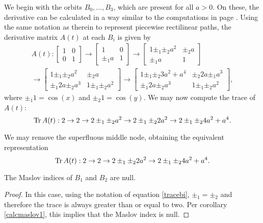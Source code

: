 We begin with the orbits $B_0, \dots, B_3$, which are present for all $a > 0$. On these, the derivative can be calculated in a way similar to the computations in page \pageref{rectpath1}. Using the same notation as therein to represent piecewise rectilinear paths, the derivative matrix $A(t)$ at each $B_i$ is given by
\begin{equation}
\begin{multlined}
A(t):
\begin{bmatrix}
1 & 0\\
0 & 1
\end{bmatrix}
\to
\begin{bmatrix}
1 & 0\\
\pm_1 a & 1
\end{bmatrix}
\to
\begin{bmatrix}
1 \pm_1 \pm_2 a^2 &  \pm_2 a\\
\pm_1 a & 1
\end{bmatrix}\\
\to
\begin{bmatrix}
1 \pm_1 \pm_2 a^2 &  \pm_2 a\\
\pm_1 2a \pm_2 a^3 & 1 \pm_1 \pm_2 a^2
\end{bmatrix}
\to
\begin{bmatrix}
1 \pm_1 \pm_2 3 a^2 + a^4 &  \pm_2 2 a \pm_1 a^3\\
\pm_1 2a \pm_2 a^3 & 1 \pm_1 \pm_2 a^2
\end{bmatrix},
\end{multlined}
\end{equation}
where $\pm_1 1 = \cos(x)$ and $\pm_2 1 = \cos(y)$. We may now compute the trace of $A(t)$:
\begin{equation}
\operatorname{Tr} A(t): 2 \to 2 \to 2 \pm_1 \pm_2 a^2 \to 2 \pm_1 \pm_2 2 a^2 \to 2 \pm_1 \pm_2 4 a^2 + a^4.
\end{equation}

We may remove the superfluous middle node, obtaining the equivalent representation
\begin{equation}\label{tracebi}
\operatorname{Tr} A(t): 2 \to 2 \to 2 \pm_1 \pm_2 2 a^2 \to 2 \pm_1 \pm_2 4 a^2 + a^4.
\end{equation}

\begin{prop}
The Maslov indices of $B_1$ and $B_2$ are null.
\end{prop}

\begin{proof}
In this case, using the notation of equation \eqref{tracebi}, $\pm_1 = \pm_2$ and therefore the trace is always greater than or equal to two. Per corollary \ref{calcmaslov1}, this implies that the Maslov index is null.
\end{proof}

